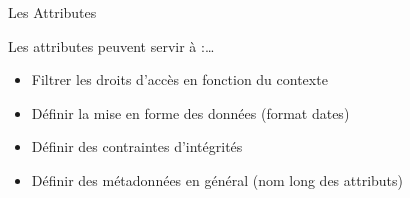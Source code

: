\begin{frame}{Les Attributes}

  Les attributes peuvent servir à :\dots
  \begin{itemize}
  \item Filtrer les droits d'accès en fonction du contexte
  \item Définir la mise en forme des données (format dates)
\item Définir des contraintes d'intégrités
\item Définir des métadonnées en général (nom long des attributs)
  \end{itemize}
\end{frame}